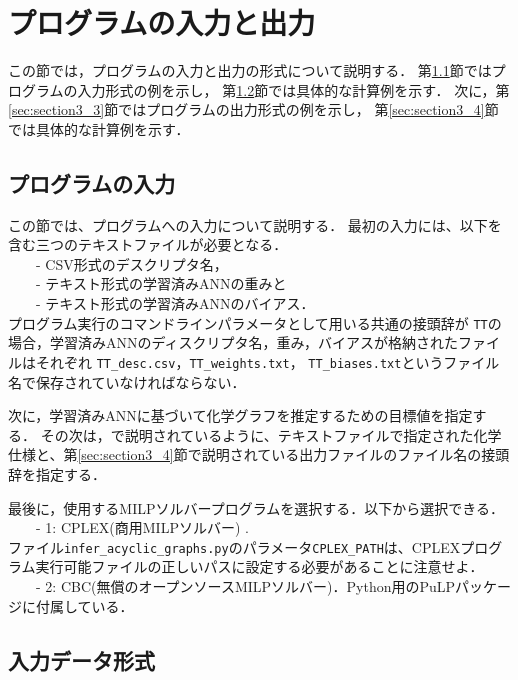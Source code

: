 \documentclass[11pt, titlepage, dvipdfmx, twoside]{jarticle}
\newcommand{\target}{目標}
\begin{document}

\section{プログラムの入力と出力}
\label{sec:InOut}

この節では，プログラムの入力と出力の形式について説明する．
第\ref{sec:section3_1}節ではプログラムの入力形式の例を示し，
第\ref{sec:section3_2}節では具体的な計算例を示す．
次に，第\ref{sec:section3_3}節ではプログラムの出力形式の例を示し，
第\ref{sec:section3_4}節では具体的な計算例を示す．


\subsection{プログラムの入力}
\label{sec:section3_1}

この節では、プログラムへの入力について説明する．
最初の入力には、以下を含む三つのテキストファイルが必要となる． \\
~~~~- CSV形式のデスクリプタ名， \\
~~~~- テキスト形式の学習済みANNの重みと\\
~~~~- テキスト形式の学習済みANNのバイアス． \\

プログラム実行のコマンドラインパラメータとして用いる共通の接頭辞が {\tt TT}の場合，学習済みANNのディスクリプタ名，重み，バイアスが格納されたファイルはそれぞれ {\tt TT\_desc.csv}，{\tt TT\_weights.txt}， {\tt TT\_biases.txt}というファイル名で保存されていなければならない．

%
次に，学習済みANNに基づいて化学グラフを推定するための\target 値を指定する．
その次は，\cite{cyclic_BH_arxiv}で説明されているように、テキストファイルで指定された化学仕様と、第\ref{sec:section3_4}節で説明されている出力ファイルのファイル名の接頭辞を指定する．

最後に，使用するMILPソルバープログラムを選択する．以下から選択できる． \\
~~~~- 1: CPLEX(商用MILPソルバー) \cite{cplex}. \\
ファイル{\tt infer\_acyclic\_graphs.py}のパラメータ{\tt CPLEX\_PATH}は、CPLEXプログラム実行可能ファイルの正しいパスに設定する必要があることに注意せよ．\\
~~~~- 2: CBC(無償のオープンソースMILPソルバー)．Python用のPuLPパッケージ\cite{PuLP1}に付属している．




\subsection{入力データ形式}
\label{sec:section3_2}
\end{document}
